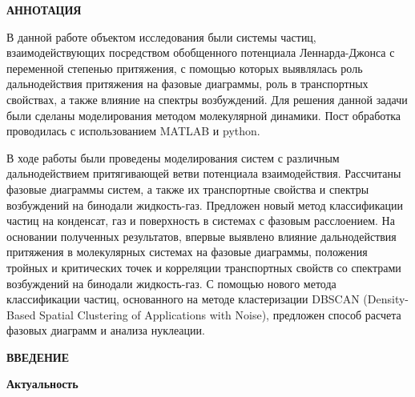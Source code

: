 
\begin{center}
\textbf{АННОТАЦИЯ}
\end{center}


В данной работе объектом исследования были системы частиц, взаимодействующих посредством обобщенного потенциала Леннарда-Джонса с переменной степенью притяжения, с помощью которых выявлялась роль дальнодействия притяжения на фазовые диаграммы, роль в транспортных свойствах, а также влияние на спектры возбуждений. Для решения данной задачи были сделаны моделирования методом молекулярной динамики. Пост обработка проводилась с использованием MATLAB и python.

В ходе работы были проведены моделирования систем с различным дальнодействием притягивающей ветви потенциала взаимодействия.
Рассчитаны фазовые диаграммы систем, а также их транспортные свойства и спектры возбуждений на бинодали жидкость-газ.
Предложен новый метод классификации частиц на конденсат, газ и поверхность в системах с фазовым расслоением.
На основании полученных результатов, впервые выявлено влияние дальнодействия притяжения в молекулярных системах на фазовые диаграммы, положения тройных и критических точек и корреляции транспортных свойств со спектрами возбуждений на бинодали жидкость-газ.
С помощью нового метода классификации частиц, основанного на методе кластеризации DBSCAN (Density-Based Spatial Clustering of Applications with Noise), предложен способ расчета фазовых диаграмм и анализа нуклеации.

\onehalfspacing
\setcounter{page}{2}

\newpage
\renewcommand{\contentsname}{\centerline{\normalsize СОДЕРЖАНИЕ}}
\tableofcontents

\newpage
\begin{center}
\textbf{ВВЕДЕНИЕ}
\end{center}


\textbf{Актуальность}

